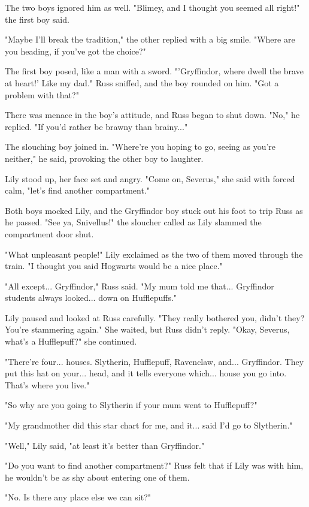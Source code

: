 \documentclass[a4paper,11pt]{article}
\begin{document}
The two boys ignored him as well. "Blimey, and I thought you seemed all right!" the first boy said.

"Maybe I'll break the tradition," the other replied with a big smile. "Where are you heading, if you've got the choice?"

The first boy posed, like a man with a sword. "'Gryffindor, where dwell the brave at heart!' Like my dad." Russ sniffed, and the boy rounded on him. "Got a problem with that?"

There was menace in the boy's attitude, and Russ began to shut down. "No," he replied. "If you'd rather be brawny than brainy..."

The slouching boy joined in. "Where're you hoping to go, seeing as you're neither," he said, provoking the other boy to laughter.

Lily stood up, her face set and angry. "Come on, Severus," she said with forced calm, "let's find another compartment."

Both boys mocked Lily, and the Gryffindor boy stuck out his foot to trip Russ as he passed. "See ya, Snivellus!" the sloucher called as Lily slammed the compartment door shut.

"What unpleasant people!" Lily exclaimed as the two of them moved through the train. "I thought you said Hogwarts would be a nice place."

"All except... Gryffindor," Russ said. "My mum told me that... Gryffindor students always looked... down on Hufflepuffs."

Lily paused and looked at Russ carefully. "They really bothered you, didn't they? You're stammering again." She waited, but Russ didn't reply. "Okay, Severus, what's a Hufflepuff?" she continued.

"There're four... houses. Slytherin, Hufflepuff, Ravenclaw, and... Gryffindor. They put this hat on your... head, and it tells everyone which... house you go into. That's where you live."

"So why are you going to Slytherin if your mum went to Hufflepuff?"

"My grandmother did this star chart for me, and it... said I'd go to Slytherin."

"Well," Lily said, "at least it's better than Gryffindor."

"Do you want to find another compartment?" Russ felt that if Lily was with him, he wouldn't be as shy about entering one of them.

"No. Is there any place else we can sit?"
\end{document}
